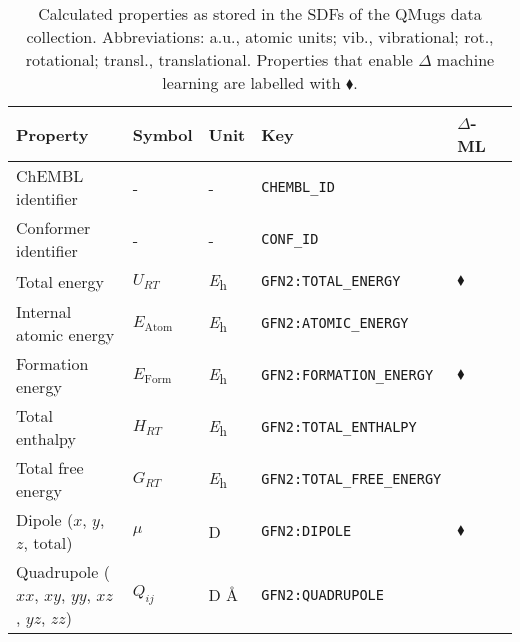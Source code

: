 \begin{table}[ht]
\footnotesize
\caption{Calculated properties as stored in the SDFs of the QMugs data collection. Abbreviations: a.u., atomic units; vib., vibrational; rot., rotational; transl., translational. Properties that enable $\Delta$ machine learning are labelled with $\blacklozenge$.}
\label{tbl:properties}
\centering
\begin{tabular}{llllll}
\toprule
\textbf{Property}                                        & \textbf{Symbol}                               & \textbf{Unit}           & \textbf{Key}  & $\Delta$-ML        \\  \midrule
ChEMBL identifier                                               &         -                      &           -              & \texttt{CHEMBL\_ID} &                \\
Conformer identifier                                                 &     -                                          &                    -     & \texttt{CONF\_ID}      &              \\
Total energy                                             & $U_{RT}$            & \si{\hartree}                      & \texttt{GFN2:TOTAL\_ENERGY} & $\blacklozenge$                  \\
Internal atomic energy                             & $E_\mathrm{Atom}$                             & \si{\hartree}                      & \texttt{GFN2:ATOMIC\_ENERGY} &       \\
Formation energy                             & $E_\mathrm{Form}$           & \si{\hartree}                      & \texttt{GFN2:FORMATION\_ENERGY}   & $\blacklozenge$          \\
Total enthalpy                                           & $H_{RT}$                                      & \si{\hartree}                      & \texttt{GFN2:TOTAL\_ENTHALPY}    &        \\
Total free energy                                        & $G_{RT}$                                      & \si{\hartree}                      & \texttt{GFN2:TOTAL\_FREE\_ENERGY} &        \\
Dipole ($x$, $y$, $z$, total)                  & $\mu$                                         & D                       & \texttt{GFN2:DIPOLE}      & $\blacklozenge$                    \\
Quadrupole ($xx$, $xy$, $yy$, $xz$, $yz$, $zz$) & $Q_{ij}$                                      & D \si{\angstrom}                 & \texttt{GFN2:QUADRUPOLE}      &           \\

\end{tabular}
\end{table}

